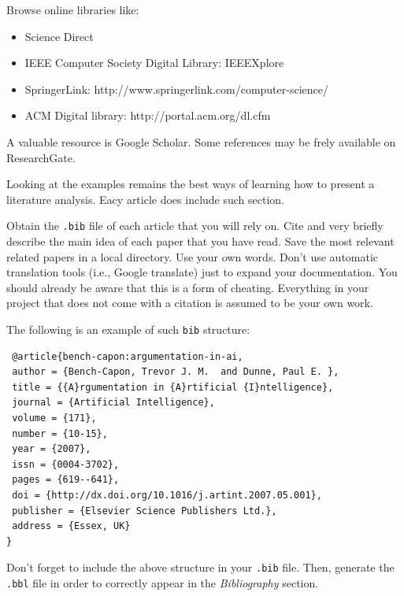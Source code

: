 \documentclass[a4paper,12pt]{report}
\begin{document}
Browse online libraries like:
\begin{itemize}
 \item Science Direct
 \item IEEE Computer Society Digital Library: IEEEXplore
 \item SpringerLink:  http://www.springerlink.com/computer-science/
 \item ACM Digital library: http://portal.acm.org/dl.cfm
\end{itemize}
A valuable resource is Google Scholar. 
Some references may be frely available on ResearchGate. 

Looking at the examples remains the best ways of learning how to present a literature analysis. 
Eacy article does include such section.


Obtain the \texttt{.bib} file of each article that you will rely on. 
Cite and very briefly describe the main idea of each paper that you have read.
Save the most relevant related papers in a local directory.
Use your own words. 
Don't use automatic translation tools (i.e., Google translate) just to expand your documentation.
You should already be aware that this is a form of cheating. 
Everything in your project that does not come with a citation is assumed to be your own work.


The following is an example of such \texttt{bib} structure:

\begin{verbatim}
 @article{bench-capon:argumentation-in-ai,
 author = {Bench-Capon, Trevor J. M.  and Dunne, Paul E. },
 title = {{A}rgumentation in {A}rtificial {I}ntelligence},
 journal = {Artificial Intelligence},
 volume = {171},
 number = {10-15},
 year = {2007},
 issn = {0004-3702},
 pages = {619--641},
 doi = {http://dx.doi.org/10.1016/j.artint.2007.05.001},
 publisher = {Elsevier Science Publishers Ltd.},
 address = {Essex, UK}
}
\end{verbatim}

Don't forget to include the above structure in your \texttt{.bib} file. 
Then, generate the \texttt{.bbl} file in order to correctly appear in the \textit{Bibliography} section.
\end{document}
